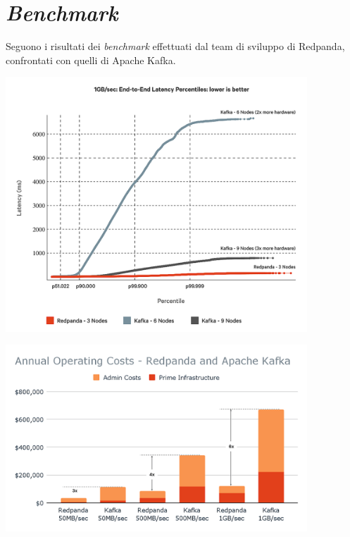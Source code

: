 \section{\textit{Benchmark}}
Seguono i risultati dei \textit{benchmark} effettuati dal team di sviluppo di Redpanda, confrontati con quelli di Apache Kafka.

\begin{center}
	\includegraphics[width=0.85\textwidth]{imgs/latency.png}
\end{center}

\begin{center}
	\includegraphics[width=0.85\textwidth]{imgs/costs.png}
\end{center}







